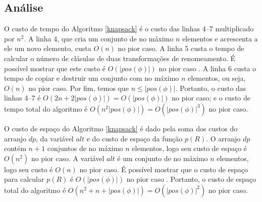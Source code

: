 \subsection{Análise}

\indent

O custo de tempo do Algoritmo \ref{knapsack} é o custo das linhas 4--7 multiplicado por $n^2$. A linha 4, que cria um conjunto de no máximo $n$ elementos e acrescenta a ele um novo elemento, custa $O(n)$ no pior caso. A linha 5 custa o tempo de calcular o número de clásulas de duas transformações de renomeamento. É possível mostrar que este custo é $O(|pos(\phi)|)$ no pior caso \cite{nonnengart2001computing}. A linha 6 custa o tempo de copiar e destruir um conjunto com no máximo $n$ elementos, ou seja, $O(n)$ no pior caso. Por fim, temos que $n \leq |pos(\phi)|$. Portanto, o custo das linhas 4--7 é $O(2n + 2|pos(\phi)|) = O(|pos(\phi)|)$ no pior caso; e o custo de tempo total do algoritmo é $O(n^2 |pos(\phi)|) = O(|pos(\phi)|^3)$ no pior caso.

O custo de espaço do Algoritmo \ref{knapsack} é dado pela soma dos custos do arranjo $dp$, da variável $alt$ e do custo de espaço da função $p(R)$. O arranjo $dp$ contém $n+1$ conjuntos de no máximo $n$ elementos, logo seu custo de espaço é $O(n^2)$ no pior caso. A variável $alt$ é um conjunto de no máximo $n$ elementos, logo seu custo é $O(n)$ no pior caso. É possível mostrar que o custo de espaço para calcular $p(R)$ é $O(|pos(\phi)|)$ no pior caso \cite{nonnengart2001computing}. Portanto, o custo de espaço total do algoritmo é $O(n^2 + n + |pos(\phi)|) = O(|pos(\phi)|^2)$ no pior caso.
